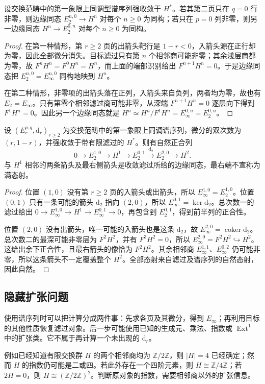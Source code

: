 \begin{proposition}\label{b4:prop:spectral-single-row}
	设交换范畴中的第一象限上同调型谱序列强收敛于 \(H^*\)。若其第二页只在 \(q=0\) 行非零，则边缘同态 \(E_2^{n,0}\to H^n\) 对每个 \(n\ge0\) 为同构；若只在 \(p=0\) 列非零，则另一边缘同态 \(H^n\to E_2^{0,n}\) 对每个 \(n\ge0\) 为同构。
\end{proposition}
\begin{proof}
	在第一种情形，第 \(r\ge2\) 页的出箭头靶行是 \(1-r<0\)，入箭头源在正行却为零，因此全部微分消失。目标滤过只有第 \(n\) 个相邻商可能非零；其余浅层商都为零，故 \(F^nH^n=F^0H^n=H^n\)，而上面的端部识别给出 \(F^{n+1}H^n=0\)。于是边缘同态把 \(E_2^{n,0}=E_\infty^{n,0}\) 同构地映到 \(H^n\)。

	在第二种情形，非零项的出箭头落在正列，入箭头来自负列，两者均为零，故也有 \(E_2=E_\infty\)。只有第零个相邻滤过商可能非零，从深端 \(F^{n+1}H^n=0\) 逐层向下得到 \(F^1H^n=0\)。因此另一个边缘同态就是 \(H^n\simeq H^n/F^1H^n=E_\infty^{0,n}=E_2^{0,n}\)。
\end{proof}

\begin{proposition}\label{b4:prop:spectral-five-term}
	设 \((E_r^{p,q},\mathrm d_r)_{r\ge2}\) 为交换范畴中的第一象限上同调谱序列，微分的双次数为 \((r,1-r)\)，并强收敛于带有限滤过的 \(H^*\)。则有自然正合列
	\[
		0\longrightarrow E_2^{1,0}\longrightarrow H^1 \longrightarrow E_2^{0,1}\xrightarrow{\mathrm{d}_2}E_2^{2,0} \longrightarrow H^2.
	\]
	与 \(H^1\) 相邻的两条箭头及最右侧箭头是收敛滤过所给的边缘同态，最右端不宣称为满态射。
\end{proposition}
\begin{proof}
	位置 \((1,0)\) 没有第 \(r\ge2\) 页的入箭头或出箭头，所以 \(E_\infty^{1,0}=E_2^{1,0}\)。位置 \((0,1)\) 只有一条可能的箭头 \(\mathrm{d}_2\) 指向 \((2,0)\)，所以 \(E_\infty^{0,1}=\ker \mathrm{d}_2\)。总次数一的滤过给出 \(0\to E_\infty^{1,0}\to H^1\to E_\infty^{0,1}\to0\)，再包含到 \(E_2^{0,1}\)，得到前半列的正合性。

	位置 \((2,0)\) 没有出箭头，唯一可能的入箭头也是这条 \(\mathrm{d}_2\)，故 \(E_\infty^{2,0}=\operatorname{coker}\mathrm{d}_2\)。总次数二的最深可能非零层为 \(F^2H^2\)，并有 \(F^3H^2=0\)，所以 \(E_\infty^{2,0}=F^2H^2\hookrightarrow H^2\)。这给出余下正合性，且最右箭头的像恰为 \(F^2H^2\)。其余相邻商 \(E_\infty^{1,1}\)、\(E_\infty^{0,2}\) 仍可能非零，所以这条箭头不一定覆盖整个 \(H^2\)。全部态射来自滤过及谱序列的自然态射，因此自然。
\end{proof}

\subsection{隐藏扩张问题}
\label{b4:subsec:1404:04}

使用谱序列时可以把计算分成两件事：先求各页及其微分，得到 \(E_\infty\)；再利用目标的其他性质恢复滤过对象。后一步可能使用已知的生成元、乘法、指数或 \(\operatorname{Ext}^1\) 中的扩张类。它不属于再计算一个未出现的 \(\mathrm{d}_r\)。

\ProseParagraphBreak
例如已经知道有限交换群 \(H\) 的两个相邻商均为 \(\mathbb Z/2\mathbb Z\)，则 \(|H|=4\) 已经确定；然而 \(H\) 的指数仍可能是二或四。若此外存在一个四阶元素，则 \(H\cong\mathbb Z/4\mathbb Z\)；若 \(2H=0\)，则 \(H\cong(\mathbb Z/2\mathbb Z)^2\)。判断原对象的指数，需要相邻商以外的扩张信息。
